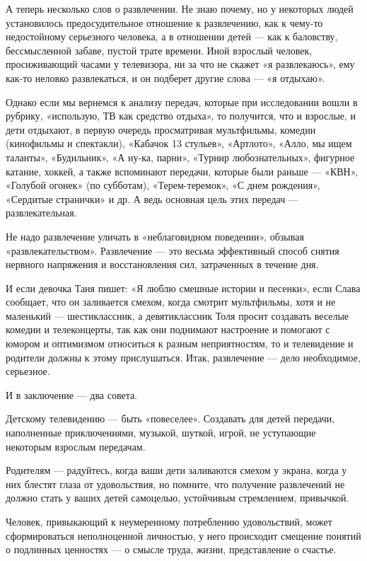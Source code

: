 \documentclass[12pt, a4paper, openany]{book}
\begin{document}
А теперь несколько слов о развлечении. Не знаю почему, но у некоторых людей установилось предосудительное отношение к развлечению, как к чему-то недостойному серьезного человека, а в отношении детей — как к баловству, бессмысленной забаве, пустой трате времени. Иной взрослый человек, просиживающий часами у телевизора, ни за что не скажет «я развлекаюсь», ему как-то неловко развлекаться, и он подберет другие слова — «я отдыхаю». 

Однако если мы вернемся к анализу передач, которые при исследовании вошли в рубрику, «использую, ТВ как средство отдыха», то получится, что и взрослые, и дети отдыхают, в первую очередь просматривая мультфильмы, комедии (кинофильмы и спектакли), «Кабачок 13 стульев», «Артлото», «Алло, мы ищем таланты», «Будильник», «А ну-ка, парни», «Турнир любознательных», фигурное катание, хоккей, а также вспоминают передачи, которые были раньше — «КВН», «Голубой огонек» (по субботам), «Терем-теремок», «С днем рождения», «Сердитые странички» и др. А ведь основная цель этих передач — развлекательная. 

Не надо развлечение уличать в «неблаговидном поведении», обзывая «развлекательством». Развлечение — это весьма эффективный способ снятия нервного напряжения и восстановления сил, затраченных в течение дня. 

И если девочка Таня пишет: «Я люблю смешные истории и песенки», если Слава сообщает, что он заливается смехом, когда смотрит мультфильмы, хотя и не маленький — шестиклассник, а девятиклассник Толя просит создавать веселые комедии и телеконцерты, так как они поднимают настроение и помогают с юмором и оптимизмом относиться к разным неприятностям, то и телевидение и родители должны к этому прислушаться. Итак, развлечение — дело необходимое, серьезное. 

И в заключение — два совета. 

Детскому телевидению — быть «повеселее». Создавать для детей передачи, наполненные приключениями, музыкой, шуткой, игрой, не уступающие некоторым взрослым передачам. 

Родителям — радуйтесь, когда ваши дети заливаются смехом у экрана, когда у них блестят глаза от удовольствия, но помните, что получение развлечений не должно стать у ваших детей самоцелью, устойчивым стремлением, привычкой. 

Человек, привыкающий к неумеренному потреблению удовольствий, может сформироваться неполноценной личностью, у него происходит смещение понятий о подлинных ценностях — о смысле труда, жизни, представление о счастье. 
\end{document}
